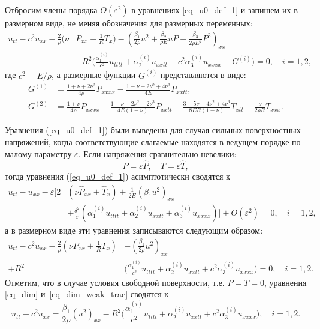 \documentclass[12pt, a4paper]{report}
\begin{document}
Отбросим члены порядка $O(\varepsilon^2)$ в уравнениях \eqref{eq_u0_def_1} и запишем их в размерном виде, не меняя обозначения для размерных переменных:
\begin{equation}\label{eq_dim}
\begin{split}
u_{tt} - c^2 u_{xx} - \frac{2}{\rho}\bigg(\nu&P_{xx} + \frac1R T_x\bigg) - \left(\frac{\beta_1}{2\rho} u^2 + \frac{\beta_2}{\rho E} u P + \frac{\beta_3}{2\rho E^2} P^2\right)_{xx}\\
& + R^2 \bigg(\frac{\alpha_1^{(i)}}{c^2} u_{tttt} + \alpha_2^{(i)} u_{xxtt} + c^2\alpha_3^{(i)} u_{xxxx} + G^{(i)} \bigg) = 0, \quad i = 1,2,
\end{split}
\end{equation}
где $c^2 = E/\rho$, а размерные функции $G^{(i)}$ представляются в виде:
\begin{align}
G^{(1)} &= \frac{1 + \nu + 2\nu^2}{4\rho} P_{xxxx} - \frac{1 - \nu + 2\nu^2 + 4\nu^3}{4E} P_{xxtt}, \label{G1}\\
G^{(2)} &= \frac{1 + \nu}{4\rho} P_{xxxx} - \frac{1 + \nu - 2\nu^2 - 2\nu^3}{4E(1 - \nu)} P_{xxtt} - \frac{3 - 5\nu - 4\nu^2 + 4\nu^3}{8ER(1 - \nu)} T_{xtt} - \frac{\nu}{2\rho R} T_{xxx}. \label{G2}
\end{align}

Уравнения (\ref{eq_u0_def_1}) были выведены для случая сильных поверхностных напряжений, когда соответствующие слагаемые находятся в ведущем порядке по малому параметру $\varepsilon$. Если напряжения сравнительно невелики:
$$
P = \varepsilon \hat P, \quad T = \varepsilon \hat T,
$$
тогда уравнения (\ref{eq_u0_def_1}) асимптотически сводятся к
\begin{equation}\label{eq_u0_def_1a}
\begin{split}
u_{tt} - u_{xx}  - \varepsilon \bigg[2&\left(\nu \hat P_{xx} + \hat T_x\right) + \frac{1}{2E} \left(\beta_1 u^2  \right)_{xx} \\
& + \frac{\delta^2}{\varepsilon} \left(\alpha_1^{(i)} u_{tttt} + \alpha_2^{(i)} u_{xxtt} + \alpha_3^{(i)} u_{xxxx}  \right)\bigg] + O(\varepsilon^2) = 0, \quad i = 1,2,
\end{split}
\end{equation}
а в размерном виде эти уравнения записываются следующим образом:
\begin{equation}\label{eq_dim_weak_trac}
\begin{split}
u_{tt} - c^2 u_{xx} - \frac{2}{\rho}\left(\nu P_{xx} + \frac1R T_x\right)  &- \left(\frac{\beta_1}{2\rho} u^2 \right)_{xx} \\
+ R^2& \bigg(\frac{\alpha_1^{(i)}}{c^2} u_{tttt} + \alpha_2^{(i)} u_{xxtt} + c^2\alpha_3^{(i)} u_{xxxx}  \bigg) = 0, \quad i = 1,2.
\end{split}
\end{equation}
Отметим, что в случае условия свободной поверхности, т.е. $P = T = 0$, уравнения \eqref{eq_dim} и~\eqref{eq_dim_weak_trac} сводятся к
\begin{equation}\label{eq_dim_free_surf}
u_{tt} - c^2 u_{xx} = \frac{\beta_1}{2\rho}\left(u^2\right)_{xx} -  R^2 \bigg(\frac{\alpha_1^{(i)}}{c^2} u_{tttt} + \alpha_2^{(i)} u_{xxtt} + c^2\alpha_3^{(i)} u_{xxxx}\bigg), \quad i = 1,2.
\end{equation}
\end{document}
